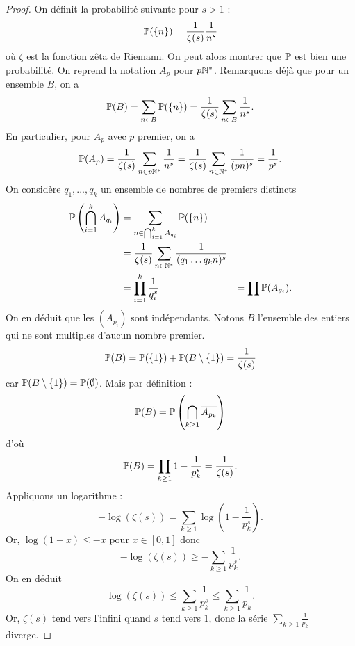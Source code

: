 \documentclass[../main.tex]{subfiles}
\begin{document}
\begin{proof}
    On définit la probabilité suivante pour \(s>1\) :
    \begin{equation}
        \mathbb{P}(\{n\}) = \frac{1}{\zeta(s)}\frac{1}{n^s}
    \end{equation}
    où \(\zeta\) est la fonction zêta de Riemann. On peut alors montrer que \(\mathbb{P}\) est bien une probabilité.
    On reprend la notation \(A_p\) pour \(p\mathbb{N}^*\). Remarquons déjà que pour un ensemble \(B\), on a 
    \begin{equation}
        \mathbb{P}(B) = \sum_{n\in B}\mathbb{P}(\{n\}) = \frac{1}{\zeta(s)}\sum_{n\in B}\frac{1}{n^s}.
    \end{equation}
    En particulier, pour \(A_p\) avec \(p\) premier, on a
    \begin{equation}
        \mathbb{P}(A_p) = \frac{1}{\zeta(s)}\sum_{n\in p\mathbb{N}^*}\frac{1}{n^s} = \frac{1}{\zeta(s)}\sum_{n\in\mathbb{N}^*}\frac{1}{(pn)^s} = \frac{1}{p^s}.
    \end{equation}
    On considère \(q_1,...,q_k\) un ensemble de nombres de premiers distincts
    \begin{align}
        \mathbb{P}\left(\bigcap_{i=1}^k A_{q_i}\right) & = \sum_{n\in\bigcap_{i=1}^kA_{q_i}}\mathbb{P}(\{n\})\\
        &= \frac{1}{\zeta(s)}\sum_{n\in \mathbb{N}^*} \frac{1}{(q_1\ldots q_kn)^s}\\
        &= \prod_{i=1}^k \frac{1}{q_i^s}
        &= \prod \mathbb{P}(A_{q_i}).
    \end{align}
    On en déduit que les \((A_{p_i})\) sont indépendants. Notons \(B\) l'ensemble des entiers qui ne sont multiples d'aucun nombre premier.
    \begin{equation}
        \mathbb{P}(B) = \mathbb{P}(\{1\}) + \mathbb{P}(B\setminus \{1\}) = \frac{1}{\zeta(s)}
    \end{equation}
    car \(\mathbb{P}(B\setminus \{1\}) = \mathbb{P}(\emptyset)\). Mais par définition :
    \begin{equation}
        \mathbb{P}(B) = \mathbb{P}\left(\bigcap_{k\ge 1} \overline{A_{p_k}}\right)
    \end{equation}
    d'où
    \begin{equation}
        \mathbb{P}(B) = \prod_{k\ge 1} 1-\frac{1}{p_k^s} = \frac{1}{\zeta(s)}.
    \end{equation}
    Appliquons un logarithme :
    \begin{equation}
        -\log(\zeta(s)) = \sum_{k\ge 1} \log\left(1-\frac{1}{p_k^s}\right).
    \end{equation}
    Or, \(\log(1-x)\le -x\) pour \(x\in[0,1]\) donc 
    \begin{equation}
        -\log(\zeta(s)) \ge -\sum_{k\ge 1} \frac{1}{p_k^s}.
    \end{equation}
On en déduit 
\begin{equation}
    \log(\zeta(s)) \le \sum_{k\ge 1} \frac{1}{p_k^s} \le \sum_{k\ge 1} \frac{1}{p_k}.
\end{equation}
Or, \(\zeta(s)\) tend vers l'infini quand \(s\) tend vers \(1\), donc la série \(\sum_{k\ge 1} \frac{1}{p_k}\) diverge.
\end{proof}
\end{document}
